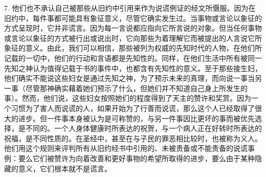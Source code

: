 7. 他们也不承认自己被那些从旧约中引用来作为说谎例证的经文所慑服。因为在旧约中，每件事都可能具有象征意义，尽管它确实发生过。当事物或言论以象征的方式呈现时，它并非谎言。因为每一言说都应指向它所言说的对象。但当任何事物或言论以象征的方式被行出或说出时，它向那些为着理解它而被提出的人言说它所象征的意义。由此，我们可以相信，那些被列为权威的先知时代的人物，在他们所记载的一切中，他们的行动和言语都是先知性的。同样，在他们生活中所有被同一先知之神认为值得记载于书的事件中，也都含有先知性的意义。至于那些接生妇，他们确实不能说这些妇女是通过先知之神，为了预示未来的真理，而向说一事当另一事（尽管那神确实藉着她们预示了什么，但她们并不知道自己身上所发生的事）。然而，他们说，这些妇女按照她们的程度得到了天主的赞许和奖赏。因为一个习惯为了害人而说谎的人，如果开始为了行善而说谎，那么这个人已经取得了很大的进步。但一件事本身被认为是可称赞的，与另一件事因比更坏的事而被优先选择，是不同的。一个人身体健康时所表达的祝贺，与一个病人正在好转时所表达的祝福，是不同性质的。在圣经中，甚至在与子民的罪恶相比较时，也被称为义人。他们用这个规则来评判所有从旧约经书中引用的、未被责备或不能责备的说谎事例：要么它们被赞许为向着改善和更好事物的希望所取得的进步，要么由于某种隐藏的意义，它们根本就不是谎言。\par

